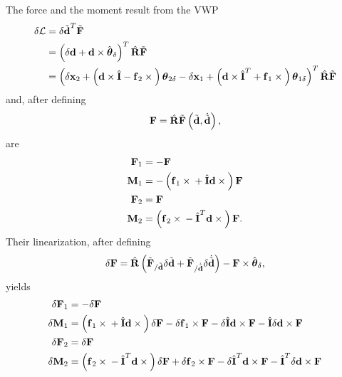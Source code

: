 \documentclass[10pt,dvips,fleqn,subeqn]{report}
\newcommand{\T}[1]{\bm{\mathbf{#1}}}
\begin{document}
The force and the moment result from the VWP
\begin{align}
	\delta\mathcal{L}
	&= \delta \tilde{\T{d}}^T \tilde{\T{F}} \nonumber \\
	&= \plbr{
		\delta\T{d}
		+ \T{d} \times \hat{\T{\theta}}_{\delta}
	}^T \hat{\T{R}} \tilde{\T{F}} \nonumber \\
	&= \plbr{
		\delta\T{x}_2
		+ \plbr{
			\T{d}\times\hat{\T{I}}
			- \T{f}_2\times{}
		} \T{\theta}_{2\delta}
		- \delta\T{x}_1
		+ \plbr{
			\T{d}\times\hat{\T{I}}^T
			+ \T{f}_1\times{}
		} \T{\theta}_{1\delta}
	}^T \hat{\T{R}} \tilde{\T{F}}
\end{align}
and, after defining
\begin{equation}
	\T{F} = \hat{\T{R}}
		\tilde{\T{F}}\plbr{\tilde{\T{d}}, \dot{\tilde{\T{d}}}} ,
\end{equation}
 are
\begin{subequations}
\begin{align}
	\T{F}_1 &= - \T{F} \\
	\T{M}_1 &= - \plbr{
		\T{f}_1 \times{}
		+ \hat{\T{I}} \T{d}\times{}
	} \T{F} \\
	\T{F}_2 &= \T{F} \\
	\T{M}_2 &= \plbr{
		\T{f}_2 \times{}
		- \hat{\T{I}}^T \T{d}\times{}
	} \T{F} .
\end{align}
\end{subequations}
Their linearization, after defining
\begin{equation}
	\delta\T{F} = \hat{\T{R}} \plbr{
		\tilde{\T{F}}_{/\tilde{\T{d}}} \delta{\tilde{\T{d}}}
		+ \tilde{\T{F}}_{/\dot{\tilde{\T{d}}}} \delta\dot{\tilde{\T{d}}}
	} - \T{F} \times \hat{\T{\theta}}_{\delta} ,
\end{equation}
yields
\begin{subequations}
\begin{align}
	\delta\T{F}_1 &= - \delta\T{F} \\
	\delta\T{M}_1 &= \plbr{
		\T{f}_1 \times{}
		+ \hat{\T{I}} \T{d}\times{}
	} \delta\T{F}
	- \delta\T{f}_1 \times \T{F}
	- \delta\hat{\T{I}} \T{d} \times \T{F}
	- \hat{\T{I}} \delta\T{d} \times \T{F} \\
	\delta\T{F}_2 &= \delta\T{F} \\
	\delta\T{M}_2 &= \plbr{
		\T{f}_2 \times{}
		- \hat{\T{I}}^T \T{d} \times{}
	} \delta\T{F}
	+ \delta\T{f}_2 \times \T{F}
	- \delta\hat{\T{I}}^T \T{d} \times \T{F}
	- \hat{\T{I}}^T \delta\T{d} \times \T{F}
\end{align}
\end{subequations}
\end{document}
